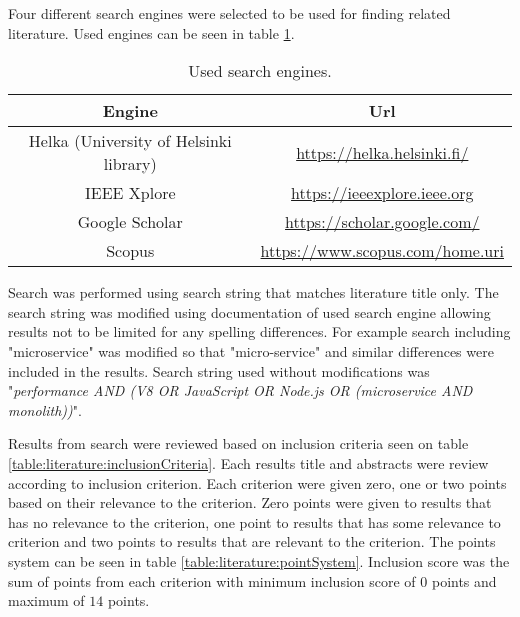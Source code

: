 Four different search engines were selected to be used for finding related literature.
Used engines can be seen in table \ref{table:literature:searchEngines}.
\begin{table}[ht!]
    \begin{tabular}{| c | c |} 
        \hline
        Engine
        & Url
        \\ [0.5ex] \hline
        
        Helka (University of Helsinki library)
        & \url{https://helka.helsinki.fi/}
        \\ \hline
        
        IEEE Xplore
        & \url{https://ieeexplore.ieee.org}
        \\ \hline
        
        Google Scholar
        & \url{https://scholar.google.com/}
        \\ \hline

        Scopus
        & \url{https://www.scopus.com/home.uri}
        \\ \hline
    \end{tabular}    
    \caption{Used search engines.}
    \label{table:literature:searchEngines}
\end{table}
Search was performed using search string that matches literature title only.
The search string was modified using documentation of used search engine allowing results not to be limited for any spelling differences.
For example search including "microservice" was modified so that "micro-service" and similar differences were included in the results.
Search string used without modifications was "\textit{performance AND (V8 OR JavaScript OR Node.js OR (microservice AND monolith))}".

Results from search were reviewed based on inclusion criteria seen on table \ref{table:literature:inclusionCriteria}.
Each results title and abstracts were review according to inclusion criterion.
Each criterion were given zero, one or two points based on their relevance to the criterion.
Zero points were given to results that has no relevance to the criterion, one point to results that has some relevance to criterion and two points to results that are relevant to the criterion.
The points system can be seen in table \ref{table:literature:pointSystem}.
Inclusion score was the sum of points from each criterion with minimum inclusion score of $0$ points and maximum of $14$ points.

